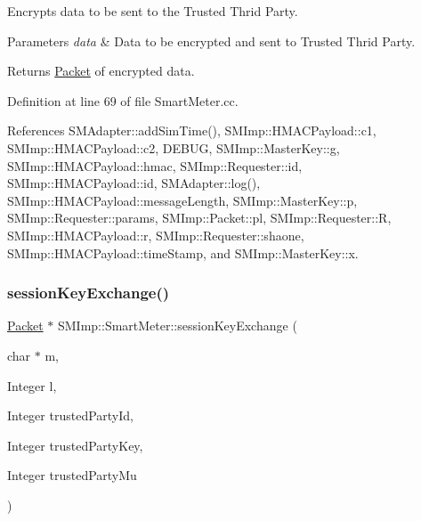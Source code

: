 Encrypts data to be sent to the Trusted Thrid Party. 
\begin{DoxyParams}{Parameters}
{\em data} & Data to be encrypted and sent to Trusted Thrid Party. \\
\hline
\end{DoxyParams}
\begin{DoxyReturn}{Returns}
\hyperlink{structSMImp_1_1Packet}{Packet} of encrypted data. 
\end{DoxyReturn}


Definition at line 69 of file Smart\+Meter.\+cc.



References S\+M\+Adapter\+::add\+Sim\+Time(), S\+M\+Imp\+::\+H\+M\+A\+C\+Payload\+::c1, S\+M\+Imp\+::\+H\+M\+A\+C\+Payload\+::c2, D\+E\+B\+UG, S\+M\+Imp\+::\+Master\+Key\+::g, S\+M\+Imp\+::\+H\+M\+A\+C\+Payload\+::hmac, S\+M\+Imp\+::\+Requester\+::id, S\+M\+Imp\+::\+H\+M\+A\+C\+Payload\+::id, S\+M\+Adapter\+::log(), S\+M\+Imp\+::\+H\+M\+A\+C\+Payload\+::message\+Length, S\+M\+Imp\+::\+Master\+Key\+::p, S\+M\+Imp\+::\+Requester\+::params, S\+M\+Imp\+::\+Packet\+::pl, S\+M\+Imp\+::\+Requester\+::R, S\+M\+Imp\+::\+H\+M\+A\+C\+Payload\+::r, S\+M\+Imp\+::\+Requester\+::shaone, S\+M\+Imp\+::\+H\+M\+A\+C\+Payload\+::time\+Stamp, and S\+M\+Imp\+::\+Master\+Key\+::x.

\mbox{\label{classSMImp_1_1SmartMeter_a9511926a038ac3ac9c65013f7dd7fb2f}} 
\subsubsection{\texorpdfstring{session\+Key\+Exchange()}{sessionKeyExchange()}}
{\footnotesize\ttfamily \hyperlink{structSMImp_1_1Packet}{Packet} $\ast$ S\+M\+Imp\+::\+Smart\+Meter\+::session\+Key\+Exchange (\begin{DoxyParamCaption}\item[{char $\ast$}]{m,  }\item[{Integer}]{l,  }\item[{Integer}]{trusted\+Party\+Id,  }\item[{Integer}]{trusted\+Party\+Key,  }\item[{Integer}]{trusted\+Party\+Mu }\end{DoxyParamCaption})}

